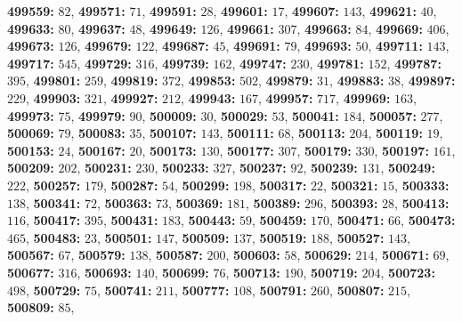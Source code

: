 \textsf{\bfseries 499559:} $82$, \textsf{\bfseries 499571:} $71$, \textsf{\bfseries 499591:} $28$, \textsf{\bfseries 499601:} $17$, \textsf{\bfseries 499607:} $143$, \textsf{\bfseries 499621:} $40$, \textsf{\bfseries 499633:} $80$, \textsf{\bfseries 499637:} $48$, \textsf{\bfseries 499649:} $126$, \textsf{\bfseries 499661:} $307$, \textsf{\bfseries 499663:} $84$, \textsf{\bfseries 499669:} $406$, \textsf{\bfseries 499673:} $126$, \textsf{\bfseries 499679:} $122$, \textsf{\bfseries 499687:} $45$, \textsf{\bfseries 499691:} $79$, \textsf{\bfseries 499693:} $50$, \textsf{\bfseries 499711:} $143$, \textsf{\bfseries 499717:} $545$, \textsf{\bfseries 499729:} $316$, \textsf{\bfseries 499739:} $162$, \textsf{\bfseries 499747:} $230$, \textsf{\bfseries 499781:} $152$, \textsf{\bfseries 499787:} $395$, \textsf{\bfseries 499801:} $259$, \textsf{\bfseries 499819:} $372$, \textsf{\bfseries 499853:} $502$, \textsf{\bfseries 499879:} $31$, \textsf{\bfseries 499883:} $38$, \textsf{\bfseries 499897:} $229$, \textsf{\bfseries 499903:} $321$, \textsf{\bfseries 499927:} $212$, \textsf{\bfseries 499943:} $167$, \textsf{\bfseries 499957:} $717$, \textsf{\bfseries 499969:} $163$, \textsf{\bfseries 499973:} $75$, \textsf{\bfseries 499979:} $90$, \textsf{\bfseries 500009:} $30$, \textsf{\bfseries 500029:} $53$, \textsf{\bfseries 500041:} $184$, \textsf{\bfseries 500057:} $277$, \textsf{\bfseries 500069:} $79$, \textsf{\bfseries 500083:} $35$, \textsf{\bfseries 500107:} $143$, \textsf{\bfseries 500111:} $68$, \textsf{\bfseries 500113:} $204$, \textsf{\bfseries 500119:} $19$, \textsf{\bfseries 500153:} $24$, \textsf{\bfseries 500167:} $20$, \textsf{\bfseries 500173:} $130$, \textsf{\bfseries 500177:} $307$, \textsf{\bfseries 500179:} $330$, \textsf{\bfseries 500197:} $161$, \textsf{\bfseries 500209:} $202$, \textsf{\bfseries 500231:} $230$, \textsf{\bfseries 500233:} $327$, \textsf{\bfseries 500237:} $92$, \textsf{\bfseries 500239:} $131$, \textsf{\bfseries 500249:} $222$, \textsf{\bfseries 500257:} $179$, \textsf{\bfseries 500287:} $54$, \textsf{\bfseries 500299:} $198$, \textsf{\bfseries 500317:} $22$, \textsf{\bfseries 500321:} $15$, \textsf{\bfseries 500333:} $138$, \textsf{\bfseries 500341:} $72$, \textsf{\bfseries 500363:} $73$, \textsf{\bfseries 500369:} $181$, \textsf{\bfseries 500389:} $296$, \textsf{\bfseries 500393:} $28$, \textsf{\bfseries 500413:} $116$, \textsf{\bfseries 500417:} $395$, \textsf{\bfseries 500431:} $183$, \textsf{\bfseries 500443:} $59$, \textsf{\bfseries 500459:} $170$, \textsf{\bfseries 500471:} $66$, \textsf{\bfseries 500473:} $465$, \textsf{\bfseries 500483:} $23$, \textsf{\bfseries 500501:} $147$, \textsf{\bfseries 500509:} $137$, \textsf{\bfseries 500519:} $188$, \textsf{\bfseries 500527:} $143$, \textsf{\bfseries 500567:} $67$, \textsf{\bfseries 500579:} $138$, \textsf{\bfseries 500587:} $200$, \textsf{\bfseries 500603:} $58$, \textsf{\bfseries 500629:} $214$, \textsf{\bfseries 500671:} $69$, \textsf{\bfseries 500677:} $316$, \textsf{\bfseries 500693:} $140$, \textsf{\bfseries 500699:} $76$, \textsf{\bfseries 500713:} $190$, \textsf{\bfseries 500719:} $204$, \textsf{\bfseries 500723:} $498$, \textsf{\bfseries 500729:} $75$, \textsf{\bfseries 500741:} $211$, \textsf{\bfseries 500777:} $108$, \textsf{\bfseries 500791:} $260$, \textsf{\bfseries 500807:} $215$, \textsf{\bfseries 500809:} $85$, 
